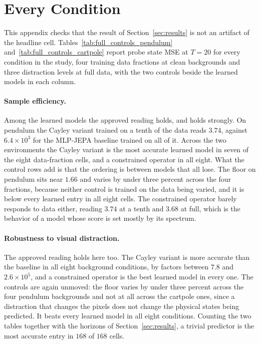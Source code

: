 \documentclass[10pt]{article} %
\begin{document}
\section{Every Condition}
\label{app:full_results}
This appendix checks that the result of Section~\ref{sec:results} is not an artifact of the headline cell. Tables~\ref{tab:full_controls_pendulum} and~\ref{tab:full_controls_cartpole} report probe state MSE at $T{=}20$ for every condition in the study, four training data fractions at clean backgrounds and three distraction levels at full data, with the two controls beside the learned models in each column.




\paragraph{Sample efficiency.}
Among the learned models the approved reading holds, and holds strongly. On pendulum the Cayley variant trained on a tenth of the data reads $3.74$, against $6.4\times10^{3}$ for the MLP-JEPA baseline trained on all of it. Across the two environments the Cayley variant is the most accurate learned model in seven of the eight data-fraction cells, and a constrained operator in all eight. What the control rows add is that the ordering is between models that all lose. The floor on pendulum sits near $1.66$ and varies by under three percent across the four fractions, because neither control is trained on the data being varied, and it is below every learned entry in all eight cells. The constrained operator barely responds to data either, reading $3.74$ at a tenth and $3.68$ at full, which is the behavior of a model whose score is set mostly by its spectrum.

\paragraph{Robustness to visual distraction.}
The approved reading holds here too. The Cayley variant is more accurate than the baseline in all eight background conditions, by factors between $7.8$ and $2.6\times10^{5}$, and a constrained operator is the best learned model in every one. The controls are again unmoved: the floor varies by under three percent across the four pendulum backgrounds and not at all across the cartpole ones, since a distraction that changes the pixels does not change the physical states being predicted. It beats every learned model in all eight conditions. Counting the two tables together with the horizons of Section~\ref{sec:results}, a trivial predictor is the most accurate entry in $168$ of $168$ cells.
\end{document}
